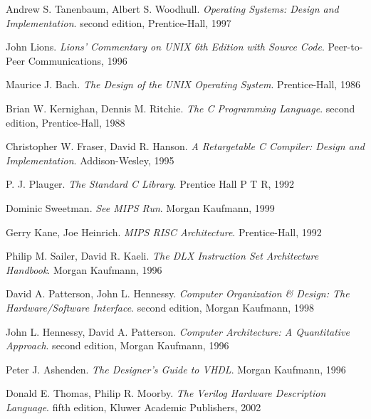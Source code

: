 \begin{thebibliography}{sotief}

Andrew S. Tanenbaum, Albert S. Woodhull. 
{\it Operating Systems: Design and Implementation}.
second edition, Prentice-Hall, 1997

John Lions.
{\it Lions' Commentary on UNIX 6th Edition with Source Code}.
Peer-to-Peer Communications, 1996

Maurice J. Bach.
{\it The Design of the UNIX Operating System}.
Prentice-Hall, 1986

Brian W. Kernighan, Dennis M. Ritchie.
{\it The C Programming Language}.
second edition, Prentice-Hall, 1988

Christopher W. Fraser, David R. Hanson.
{\it A Retargetable C Compiler: Design and Implementation}.
Addison-Wesley, 1995

P. J. Plauger.
{\it The Standard C Library}.
Prentice Hall P T R, 1992

Dominic Sweetman.
{\it See MIPS Run}.
Morgan Kaufmann, 1999

Gerry Kane, Joe Heinrich.
{\it MIPS RISC Architecture}.
Prentice-Hall, 1992

Philip M. Sailer, David R. Kaeli.
{\it The DLX Instruction Set Architecture Handbook}.
Morgan Kaufmann, 1996

David A. Patterson, John L. Hennessy.
{\it Computer Organization \& Design: The Hardware/Software Interface}.
second edition, Morgan Kaufmann, 1998

John L. Hennessy, David A. Patterson.
{\it Computer Architecture: A Quantitative Approach}.
second edition, Morgan Kaufmann, 1996

Peter J. Ashenden.
{\it The Designer's Guide to VHDL}.
Morgan Kaufmann, 1996

Donald E. Thomas, Philip R. Moorby.
{\it The Verilog Hardware Description Language}.
fifth edition, Kluwer Academic Publishers, 2002

\end{thebibliography}

